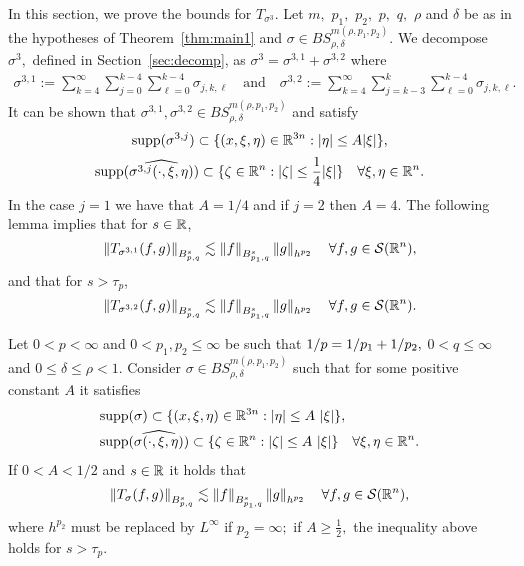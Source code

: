 In this section, we prove the bounds for $T_{\sigma^3}$. Let $m,$ $p_1,$ $p_2,$ $p,$ $q,$   $\rho$ and $\delta$ be as in the hypotheses of Theorem~\ref{thm:main1} and $\sigma\in BS^{m(\rho,p_1,p_2)}_{\rho,\delta}.$ We decompose $\sigma^3,$ defined in Section~\ref{sec:decomp}, as $\sigma^3=\sigma^{3,1}+\sigma^{3,2}$ where
\begin{align*}
\sigma^{3,1}:=  \sum\limits_{k=4}^\infty \sum\limits_{j=0}^{k-4} \sum\limits_{\ell =0}^{k-4} \sigma_{j,k,\ell}\quad \text{and}\quad \sigma^{3,2}:= \sum\limits_{k=4}^\infty \sum\limits_{j=k-3}^k \sum\limits_{\ell =0}^{k-4} \sigma_{j,k,\ell}.
\end{align*}
It can be shown that $\sigma^{3,1}, \sigma^{3,2} \in BS^{m(\rho,p_1,p_2)}_{\rho,\delta}$ and satisfy 
\begin{equation*}
\text{supp}(\sigma^{3,j}) \subset \{ (x,\xi,\eta) \in \re^{3n}:|\eta| \leq A |\xi| \},
\end{equation*}
\begin{equation*}
\text{\supp}(\widehat{\sigma^{3,j}(\cdot,\xi,\eta)}) \subset \{\zeta \in \re^{n}: |\zeta| \leq \frac{1}{4} |\xi| \} \quad \forall \xi,\eta\in\rn.
\end{equation*}
In the case $j=1$ we have that $A=1/4$ and if $j=2$ then $A = 4$.
The following lemma implies that for $s\in\re$,
\begin{equation}\label{eq:T31}
\norm{T_{\sigma^{3,1}}(f,g)}{\ibes{p}{s}{q}}\lesssim \norm{f}{\ibes{p_1}{s}{q}}\norm{g}{h^{p_2}} \quad \forall f,g\in \sw,
\end{equation}
and that for $s>\tau_p$,
\begin{equation}\label{eq:T32}
\norm{T_{\sigma^{3,2}}(f,g)}{\ibes{p}{s}{q}}\lesssim \norm{f}{\ibes{p_1}{s}{q}}\norm{g}{h^{p_2}} \quad \forall f,g\in \sw.
\end{equation}



\begin{lemma}\label{lem:T3}  Let $0<p<\infty$ and $0<p_1,p_2\le \infty$ be such that $\hcline,$ $0<q\le \infty$  and  $0\le \delta\le \rho<1.$   Consider $\sigma\in BS^{m(\rho,p_1,p_2)}_{\rho,\delta}$  such that for some positive constant $A$ it satisfies
\begin{align}
&\supp(\sigma)\subset\{(x,\xi,\eta)\in \re^{3n}: \abs{\eta}\le A\, \abs{\xi}\},\label{eq:supp1}\\
&\supp(\widehat{\sigma(\cdot,\xi,\eta)}) \subset\{\zeta\in\rn: \abs{\zeta}\le A\, \abs{\xi}\}\quad \forall \xi,\eta\in\rn. \label{eq:supp2}
\end{align}
 If $0<A<1/2$ and $s\in\re$ it holds that
\begin{equation*}
\norm{T_\sigma(f,g)}{\ibes{p}{s}{q}}\lesssim \norm{f}{\ibes{p_1}{s}{q}}\norm{g}{h^{p_2}} \quad \forall f,g\in \sw,
\end{equation*}
where $h^{p_2}$ must be replaced by $L^\infty$ if $p_2=\infty;$  if $A\ge\frac{1}{2},$ the inequality above holds for $s>\tau_p.$ 
\end{lemma}
 



